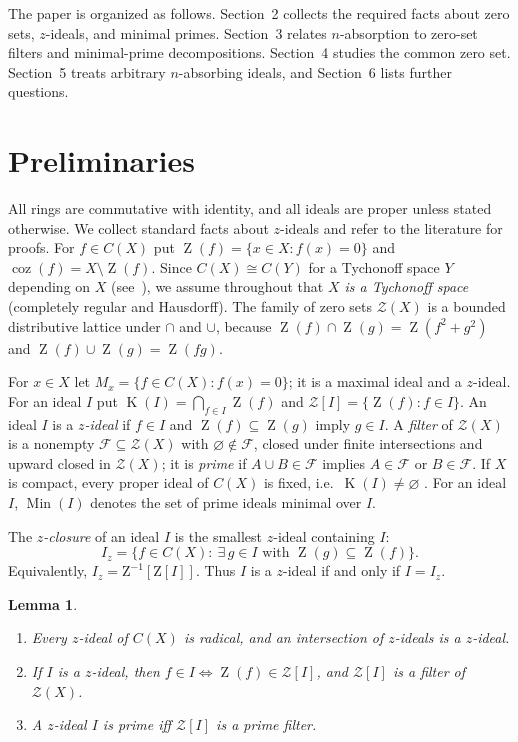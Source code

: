 \documentclass[11pt]{amsart}
\newtheorem{lemma}[theorem]{Lemma}
\theoremstyle{definition}
\theoremstyle{remark}
\DeclareMathOperator{\coz}{coz}
\DeclareMathOperator{\Min}{Min}
\DeclareMathOperator{\Z}{Z}
\DeclareMathOperator{\K}{K}
\newcommand{\CZ}{\mathcal Z}
\newcommand{\F}{\mathcal F}
\begin{document}
The paper is organized as follows. Section~2 collects the required
facts about zero sets, $z$-ideals, and minimal primes. Section~3 relates
$n$-absorption to zero-set filters and minimal-prime decompositions.
Section~4 studies the common zero set. Section~5 treats arbitrary
$n$-absorbing ideals, and Section~6 lists further questions.

\section{Preliminaries}

All rings are commutative with identity, and all ideals are proper
unless stated otherwise. We collect standard facts about $z$-ideals and
refer to the literature for proofs. For $f\in C(X)$ put
$\Z(f)=\{x\in X: f(x)=0\}$ and $\coz(f)=X\setminus\Z(f)$.
Since $C(X)\cong C(Y)$ for a Tychonoff space $Y$ depending on $X$
(see~\cite[Chapter~3]{GillmanJerison}), we assume throughout that
\emph{$X$ is a Tychonoff space} (completely regular and Hausdorff).
The family of zero sets $\CZ(X)$ is a bounded distributive lattice
under $\cap$ and $\cup$, because $\Z(f)\cap\Z(g)=\Z(f^2+g^2)$ and
$\Z(f)\cup\Z(g)=\Z(fg)$.

For $x\in X$ let $M_x=\{f\in C(X):f(x)=0\}$; it is a maximal ideal and
a $z$-ideal. For an ideal $I$ put
$\K(I)=\bigcap_{f\in I}\Z(f)$ and $\CZ[I]=\{\Z(f):f\in I\}$.
An ideal $I$ is a \emph{$z$-ideal} if $f\in I$ and
$\Z(f)\subseteq\Z(g)$ imply $g\in I$.
A \emph{filter} of $\CZ(X)$ is a nonempty $\F\subseteq\CZ(X)$ with
$\varnothing\notin\F$, closed under finite intersections and upward
closed in $\CZ(X)$; it is \emph{prime} if $A\cup B\in\F$ implies
$A\in\F$ or $B\in\F$.
If $X$ is compact, every proper ideal of $C(X)$ is fixed, i.e.\
$\K(I)\neq\varnothing$ \cite[Chapter~4]{GillmanJerison}.
For an ideal $I$, $\Min(I)$ denotes the set of prime ideals minimal over
$I$.

The \emph{$z$-closure} of an ideal $I$ is the smallest $z$-ideal containing $I$:
\[
I_z=\bigl\{f\in C(X):\ \exists\,g\in I\text{ with }\Z(g)\subseteq\Z(f)\bigr\}.
\]
Equivalently, $I_z=\mathrm{Z}^{-1}[\mathrm{Z}[I]]$. Thus $I$ is a $z$-ideal
if and only if $I=I_z$.

\begin{lemma}
\label{lem:basic}
\begin{enumerate}[label=\textup{(\alph*)}]
\item Every $z$-ideal of $C(X)$ is radical, and an intersection of
$z$-ideals is a $z$-ideal.
\item If $I$ is a $z$-ideal, then $f\in I\iff\Z(f)\in\CZ[I]$, and
$\CZ[I]$ is a filter of $\CZ(X)$.
\item A $z$-ideal $I$ is prime iff $\CZ[I]$ is a prime filter.
\end{enumerate}
\end{lemma}
\end{document}
